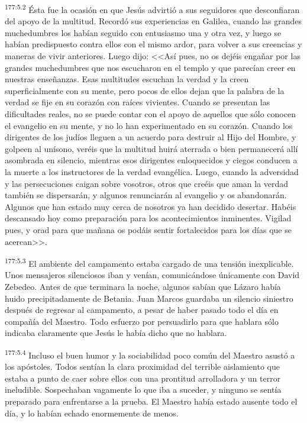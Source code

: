 \par 
\textsuperscript{177:5.2} Ésta fue la ocasión en que Jesús advirtió a sus seguidores que desconfiaran del apoyo de la multitud. Recordó sus experiencias en Galilea, cuando las grandes muchedumbres los habían seguido con entusiasmo una y otra vez, y luego se habían predispuesto contra ellos con el mismo ardor, para volver a sus creencias y maneras de vivir anteriores. Luego dijo: <<Así pues, no os dejéis engañar por las grandes muchedumbres que nos escucharon en el templo y que parecían creer en nuestras enseñanzas. Esas multitudes escuchan la verdad y la creen superficialmente con su mente, pero pocos de ellos dejan que la palabra de la verdad se fije en su corazón con raíces vivientes. Cuando se presentan las dificultades reales, no se puede contar con el apoyo de aquellos que sólo conocen el evangelio en su mente, y no lo han experimentado en su corazón. Cuando los dirigentes de los judíos lleguen a un acuerdo para destruir al Hijo del Hombre, y golpeen al unísono, veréis que la multitud huirá aterrada o bien permanecerá allí asombrada en silencio, mientras esos dirigentes enloquecidos y ciegos conducen a la muerte a los instructores de la verdad evangélica. Luego, cuando la adversidad y las persecuciones caigan sobre vosotros, otros que creéis que aman la verdad también se dispersarán, y algunos renunciarán al evangelio y os abandonarán. Algunos que han estado muy cerca de nosotros ya han decidido desertar. Habéis descansado hoy como preparación para los acontecimientos inminentes. Vigilad pues, y orad para que mañana os podáis sentir fortalecidos para los días que se acercan>>.

\par 
\textsuperscript{177:5.3} El ambiente del campamento estaba cargado de una tensión inexplicable. Unos mensajeros silenciosos iban y venían, comunicándose únicamente con David Zebedeo. Antes de que terminara la noche, algunos sabían que Lázaro había huido precipitadamente de Betania. Juan Marcos guardaba un silencio siniestro después de regresar al campamento, a pesar de haber pasado todo el día en compañía del Maestro. Todo esfuerzo por persuadirlo para que hablara sólo indicaba claramente que Jesús le había dicho que no hablara.

\par 
\textsuperscript{177:5.4} Incluso el buen humor y la sociabilidad poco común del Maestro asustó a los apóstoles. Todos sentían la clara proximidad del terrible aislamiento que estaba a punto de caer sobre ellos con una prontitud arrolladora y un terror ineludible. Sospechaban vagamente lo que iba a suceder, y ninguno se sentía preparado para enfrentarse a la prueba. El Maestro había estado ausente todo el día, y lo habían echado enormemente de menos.

